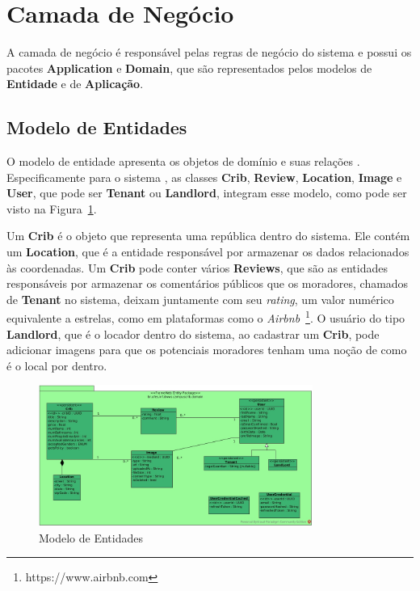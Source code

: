 \section{Camada de Negócio}
\label{sec-frameweb-negocio}

A camada de negócio é responsável pelas regras de negócio do sistema e possui os pacotes \textbf{Application} e \textbf{Domain}, que são representados pelos modelos de \textbf{Entidade} e de \textbf{Aplicação}.

\subsection{Modelo de Entidades}

O modelo de entidade apresenta os objetos de domínio e suas relações \cite{phdthesis}. Especificamente para o sistema \emph{\imprimirtitulo}, as classes \textbf{Crib}, \textbf{Review}, \textbf{Location}, \textbf{Image} e \textbf{User}, que pode ser \textbf{Tenant} ou \textbf{Landlord}, integram esse modelo, como pode ser visto na Figura~\ref{figura-arquitetura-entidades}. 

Um \textbf{Crib} é o objeto que representa uma república dentro do sistema. Ele contém um \textbf{Location}, que é a entidade responsável por armazenar os dados relacionados às coordenadas. Um \textbf{Crib} pode conter vários \textbf{Reviews}, que são as entidades responsáveis por armazenar os comentários públicos que os moradores, chamados de \textbf{Tenant} no sistema, deixam juntamente com seu \emph{rating}, um valor numérico equivalente a estrelas, como em plataformas como o \textit{Airbnb}~\footnote{https://www.airbnb.com}. O usuário do tipo \textbf{Landlord}, que é o locador dentro do sistema, ao cadastrar um \textbf{Crib}, pode adicionar imagens para que os potenciais moradores tenham uma noção de como é o local por dentro.

\begin{figure}[h]
	\centering
	\includegraphics[width=0.8\textwidth]{figuras/modelo-de-entidades.jpg}
	\caption{Modelo de Entidades}
	\label{figura-arquitetura-entidades}
\end{figure}

